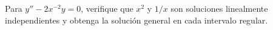 Para $y''-2x^{-2}y=0$, verifique que $x^2$ y $1/x$ son soluciones linealmente independientes y obtenga la solución general en cada intervalo regular.
